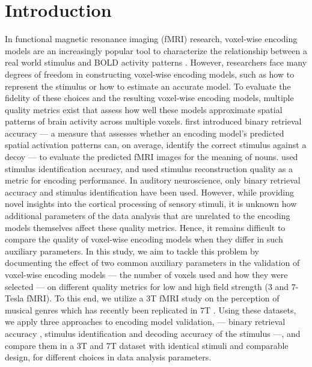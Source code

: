 \section*{Introduction}

In functional magnetic resonance imaging (f{MRI}) research, voxel-wise encoding models are an increasingly popular tool to characterize the relationship between a real world stimulus and BOLD activity patterns \citep{TD+06,KG+08,NG11,huth2012continuous,holdgraf2016rapid}. However, researchers face many degrees of freedom in constructing voxel-wise encoding models, such as how to represent the stimulus or how to estimate an accurate model. To evaluate the fidelity of these choices and the resulting voxel-wise encoding models, multiple quality metrics exist that assess how well these models approximate spatial patterns of brain activity across multiple voxels. \citet{ML08} first introduced binary retrieval accuracy --- a measure that assesses whether an encoding model's predicted spatial activation patterns can, on average, identify the correct stimulus against a decoy --- to evaluate the predicted f{MRI} images for the meaning of nouns. \citet{KG+08} used stimulus identification accuracy, and \citet{NG09} used stimulus reconstruction quality as a metric for encoding performance. In auditory neuroscience, only binary retrieval accuracy \citep{CTK+2012,hoefle2018identifying} and stimulus identification \citep{SF14,allen2018encoding} have been used.
However, while providing novel insights into the cortical processing of sensory stimuli, it is unknown how additional parameters of the data analysis that are unrelated to the encoding models themselves affect these quality metrics. Hence, it remains difficult to compare the quality of voxel-wise encoding models when they differ in such auxiliary parameters.
In this study, we aim to tackle this problem by documenting the effect of two common auxiliary parameters in the validation of voxel-wise encoding models --- the number of voxels used and how they were selected --- on different quality metrics for low and high field strength (3 and 7-Tesla f{MRI}). To this end, we utilize a 3T f{MRI} study on the perception of musical genres \citep{CTK+2012} which has recently been replicated in 7T \citep{HDH+2015}. Using these datasets, we apply three approaches to encoding model validation, --- binary retrieval accuracy \citep{ML08}, stimulus identification \citep{KG+08,SF14} and decoding accuracy of the stimulus \citep{NG09} ---, and compare them in a 3T and 7T dataset with identical stimuli and comparable design, for different choices in data analysis parameters.


